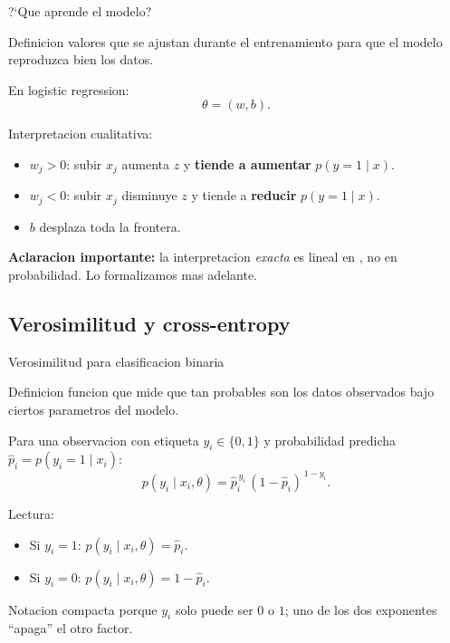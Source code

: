 \begin{frame}{?`Que aprende el modelo?}
\begin{block}{Definicion}
\small
{} valores que se ajustan durante el entrenamiento para que el modelo reproduzca bien los datos.
\end{block}

\vspace{0.25em}
En logistic regression:
\[
\theta = (w, b).
\]

\vspace{0.25em}
Interpretacion cualitativa:
\begin{itemize}\small
  \item $w_j>0$: subir $x_j$ aumenta $z$ y \textbf{tiende a aumentar} $p(y=1\mid x)$.
  \item $w_j<0$: subir $x_j$ disminuye $z$ y tiende a \textbf{reducir} $p(y=1\mid x)$.
  \item $b$ desplaza toda la frontera.
\end{itemize}

\vspace{0.2em}
{\footnotesize \textbf{Aclaracion importante:} la interpretacion \emph{exacta} es lineal en , no en probabilidad. Lo formalizamos mas adelante.}
\end{frame}

\subsection{Verosimilitud y cross-entropy}

\begin{frame}{Verosimilitud para clasificacion binaria}
\begin{block}{Definicion}
\small
{} funcion que mide que tan probables son los datos observados bajo ciertos parametros del modelo.
\end{block}

\vspace{0.2em}
Para una observacion con etiqueta $y_i\in\{0,1\}$ y probabilidad predicha $\hat p_i = p(y_i=1\mid x_i)$:
\[
p(y_i \mid x_i, \theta) = \hat p_i^{\,y_i}\,(1-\hat p_i)^{\,1-y_i}.
\]

\vspace{0.25em}
Lectura:
\begin{itemize}\small
  \item Si $y_i=1$: $p(y_i\mid x_i,\theta)=\hat p_i$.
  \item Si $y_i=0$: $p(y_i\mid x_i,\theta)=1-\hat p_i$.
\end{itemize}

\vspace{0.2em}
{\footnotesize Notacion compacta porque $y_i$ solo puede ser $0$ o $1$; uno de los dos exponentes ``apaga'' el otro factor.}
\end{frame}

